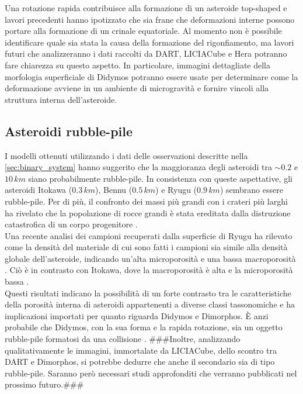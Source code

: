 \documentclass[a4paper,11pt,openright]{book}
\begin{document}
Una rotazione rapida contribuisce alla formazione di un asteroide top-shaped e lavori precedenti \citep{walsh_rotational_2008, walsh_spin-up_2012} hanno ipotizzato che sia frane che deformazioni interne possono portare alla formazione di un crinale equatoriale. Al momento non è possibile identificare quale sia stata la causa della formazione del rigonfiamento, ma lavori futuri che analizzeranno i dati raccolti da DART, LICIACube e Hera potranno fare chiarezza su questo aspetto. In particolare, immagini dettagliate della morfologia superficiale di Didymos potranno essere usate per determinare come la deformazione avviene in un ambiente di microgravità e fornire vincoli alla struttura interna dell'asteroide.

\subsection{Asteroidi rubble-pile}
I modelli ottenuti utilizzando i dati delle osservazioni descritte nella \cref{sec:binary_system} hanno suggerito che la maggioranza degli asteroidi tra $\sim 0.2$ e $10\,km$ siano probabilmente rubble-pile. In consistenza con queste aspettative, gli asteroidi Itokawa ($0.3\,km$), Bennu ($0.5\,km$) e Ryugu ($0.9\,km$) sembrano essere rubble-pile. Per di più, il confronto dei massi più grandi con i crateri più larghi ha rivelato che la popolazione di rocce grandi è stata ereditata dalla distruzione catastrofica di un corpo progenitore \citep{DellaGiustina2019}.\\
Una recente analisi dei campioni recuperati dalla superficie di Ryugu ha rilevato come la densità del materiale di cui sono fatti i campioni sia simile alla densità globale dell'asteroide, indicando un'alta microporosità e una bassa macroporosità \citep{pilorget_first_2021}. Ciò è in contrasto con Itokawa, dove la macroporosità è alta e la microporosità bassa \citep{tsuchiyama_three-dimensional_2014}.\\
Questi risultati indicano la possibilità di un forte contrasto tra le caratteristiche della porosità interna di asteroidi appartenenti a diverse classi tassonomiche e ha implicazioni importati per quanto riguarda Didymos e Dimorphos. È anzi probabile che Didymos, con la sua forma e la rapida rotazione, sia un oggetto rubble-pile formatosi da una collisione \citep{zhang_creep_2021}. \#\#\#Inoltre, analizzando qualitativamente le immagini, immortalate da LICIACube, dello scontro tra DART e Dimorphos, si potrebbe dedurre che anche il secondario sia di tipo rubble-pile. Saranno però necessari studi approfonditi che verranno pubblicati nel prossimo futuro.\#\#\#
\end{document}
